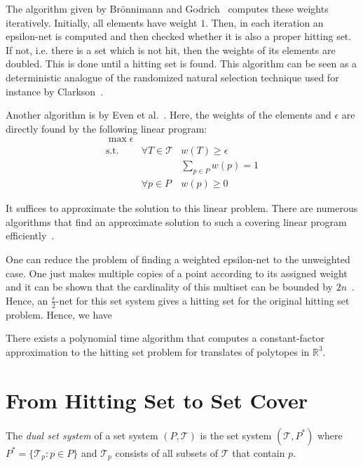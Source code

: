 \documentclass{stacs_proc}
\newcommand{\setR}{\mathbb{R}}
\newcommand{\T}{\mathcal{T}}
\DeclareMathOperator{\st}{s.t.}
\begin{document}
The algorithm given by Br\"{o}nnimann and Godrich~\cite{BG94} computes
these weights iteratively. Initially, all elements have weight
$1$. Then, in each iteration an epsilon-net is computed and then
checked whether it is also a proper hitting set. If not, i.e. there is
a set which is not hit, then the weights of its elements are
doubled. This is done until a hitting set is found. This algorithm can
be seen as a deterministic analogue of the randomized natural
selection technique used for instance by Clarkson~\cite{C95}. 

Another algorithm is by Even et al.~\cite{ERS05}. Here, the weights of
the elements and $\epsilon$ are directly found by the following linear
program: 
\begin{eqnarray}
  \max \epsilon \\
  \st & \forall T\in \T & w(T)\geq \epsilon  \\
  &  & \sum_{p\in P} w(p) = 1 \\
  & \forall p\in P & w(p)\geq 0 
\end{eqnarray} 

It suffices to approximate the solution to this linear problem. There
are numerous algorithms that find an approximate solution to such a
covering linear program efficiently~\cite{Y95, GK98}.

One can reduce the problem of finding a weighted epsilon-net to the
unweighted case. One just makes multiple copies of a point according
to its assigned weight and it can be shown that the cardinality of
this multiset can be bounded by $2n$~\cite{CV05}. 
Hence, an $\frac{\epsilon}{2}$-net for this set
system gives a hitting set for the original hitting set problem.
Hence, we have
\begin{theorem}
  There exists a polynomial time algorithm that computes a
  constant-factor approximation to the hitting set problem for
  translates of polytopes in $\setR^3$. 
\end{theorem} 


\vskip-0.3cm
\section{From Hitting Set to Set Cover}

\begin{defi}
  The \emph{dual set system} of a set system $(P, \T)$ is the set
  system $(\T, P^*)$ where $P^*=\{\T_p : p\in P\}$ and $\T_p$ consists of
  all subsets of $\T$ that contain $p$. 
\end{defi}
\end{document}
